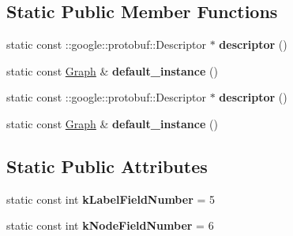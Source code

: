 \subsection*{Static Public Member Functions}
\begin{DoxyCompactItemize}
\item 
\hypertarget{classgraph_1_1Graph_a8bfea158f8526357050564853da8e82c}{
static const ::google::protobuf::Descriptor $\ast$ {\bfseries descriptor} ()}
\label{classgraph_1_1Graph_a8bfea158f8526357050564853da8e82c}

\item 
\hypertarget{classgraph_1_1Graph_afa1437b79a9597004ba39bdc4df16fab}{
static const \hyperlink{classgraph_1_1Graph}{Graph} \& {\bfseries default\_\-instance} ()}
\label{classgraph_1_1Graph_afa1437b79a9597004ba39bdc4df16fab}

\item 
\hypertarget{classgraph_1_1Graph_a49c810d7ea8428dc769f56d61a24e052}{
static const ::google::protobuf::Descriptor $\ast$ {\bfseries descriptor} ()}
\label{classgraph_1_1Graph_a49c810d7ea8428dc769f56d61a24e052}

\item 
\hypertarget{classgraph_1_1Graph_a034b07f25ab695cb26a0bd5b307d72e4}{
static const \hyperlink{classgraph_1_1Graph}{Graph} \& {\bfseries default\_\-instance} ()}
\label{classgraph_1_1Graph_a034b07f25ab695cb26a0bd5b307d72e4}

\end{DoxyCompactItemize}
\subsection*{Static Public Attributes}
\begin{DoxyCompactItemize}
\item 
\hypertarget{classgraph_1_1Graph_a2969c2c72eb20aaca51ff8e34e607914}{
static const int {\bfseries kLabelFieldNumber} = 5}
\label{classgraph_1_1Graph_a2969c2c72eb20aaca51ff8e34e607914}

\item 
\hypertarget{classgraph_1_1Graph_a3784b95d1729d17dcaf95adbda08c119}{
static const int {\bfseries kNodeFieldNumber} = 6}
\label{classgraph_1_1Graph_a3784b95d1729d17dcaf95adbda08c119}

\end{DoxyCompactItemize}
